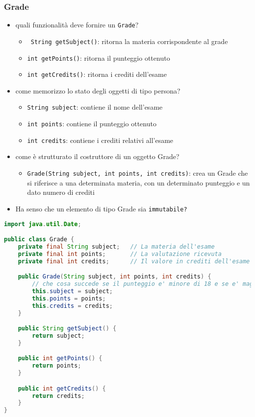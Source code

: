 \documentclass{article}
\begin{document}
\subsubsection{Grade}
\begin{itemize}
\item quali funzionalit\`a deve fornire un \texttt{Grade}?
\begin{itemize}
\item \texttt{ String getSubject()}: ritorna la materia corrispondente al grade
\item \texttt{int getPoints()}: ritorna il punteggio ottenuto
\item \texttt{int getCredits()}: ritorna i crediti dell'esame
\end{itemize}
\item come memorizzo lo stato degli oggetti di tipo persona?
\begin{itemize}
\item \texttt{String subject}: contiene il nome dell'esame
\item \texttt{int points}: contiene il punteggio ottenuto
\item \texttt{int credits}: contiene i crediti relativi all'esame
\end{itemize}
\item come \`e strutturato il costruttore di un oggetto Grade?
\begin{itemize}
\item \texttt{Grade(String subject, int points, int credits)}: crea un Grade che si riferisce a una determinata materia, con un determinato punteggio e un dato numero di crediti
\end{itemize}
\item Ha senso che un elemento di tipo Grade sia \texttt{immutabile?}
\end{itemize}

\begin{lstlisting}[language=Java,escapechar=|]
import java.util.Date;

public class Grade {
	private final String subject; 	// La materia dell'esame
	private final int points;		// La valutazione ricevuta
	private final int credits;		// Il valore in crediti dell'esame

	public Grade(String subject, int points, int credits) {
	    // che cosa succede se il punteggio e' minore di 18 e se e' maggiore di 30?
		this.subject = subject;
		this.points = points;
		this.credits = credits;
	}

	public String getSubject() {
		return subject;
	}

	public int getPoints() {
		return points;
	}

	public int getCredits() {
		return credits;
	}
}
\end{lstlisting}
\end{document}
